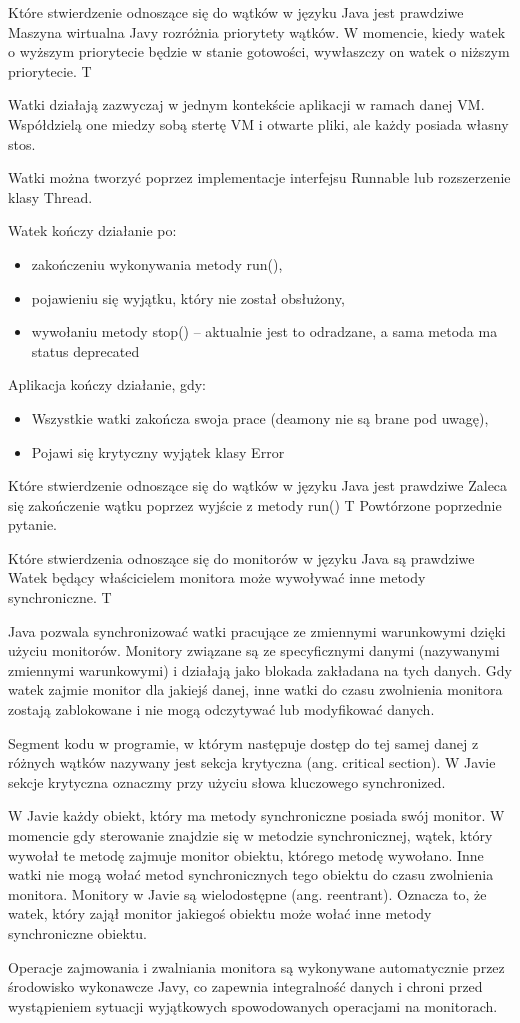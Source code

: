 \answer
{Które stwierdzenie odnoszące się do wątków w języku Java jest prawdziwe}
{Maszyna wirtualna Javy rozróżnia priorytety wątków. W momencie, kiedy watek o wyższym priorytecie będzie w stanie gotowości, wywłaszczy on watek o niższym priorytecie.}
{T}
{Watki działają zazwyczaj w jednym kontekście aplikacji w ramach danej VM. Współdzielą one miedzy sobą stertę VM i otwarte pliki, ale każdy posiada własny stos. 

Watki można tworzyć poprzez implementacje interfejsu Runnable lub rozszerzenie klasy Thread.

Watek kończy działanie po:
\begin{itemize}
 \item zakończeniu wykonywania metody run(),
 \item pojawieniu się wyjątku, który nie został obsłużony,
 \item wywołaniu metody stop() – aktualnie jest to odradzane, a sama metoda ma status deprecated
 \end{itemize}
Aplikacja kończy działanie, gdy:
 \begin{itemize}
 \item Wszystkie watki zakończa swoja prace (deamony nie są brane pod uwagę),
 \item Pojawi się krytyczny wyjątek klasy Error
\end{itemize}
 }
{}

\answer
{Które stwierdzenie odnoszące się do wątków w języku Java jest prawdziwe}
{ Zaleca się zakończenie wątku poprzez wyjście z metody run()}
{T}
{Powtórzone poprzednie pytanie.}
{}

\answer
{Które stwierdzenia odnoszące się do monitorów w języku Java są prawdziwe}
{Watek będący właścicielem monitora może wywoływać inne metody synchroniczne. }
{T}
{Java pozwala synchronizować watki pracujące ze zmiennymi warunkowymi dzięki użyciu monitorów. Monitory związane są ze specyficznymi danymi (nazywanymi zmiennymi warunkowymi) i działają jako blokada zakładana na tych danych. Gdy watek zajmie monitor dla jakiejś danej, inne watki do czasu zwolnienia monitora zostają zablokowane i nie mogą odczytywać lub modyfikować danych.

Segment kodu w programie, w którym następuje dostęp do tej samej danej z różnych wątków nazywany jest sekcja krytyczna (ang. critical section). W Javie sekcje krytyczna oznaczmy przy użyciu słowa kluczowego synchronized.

W Javie każdy obiekt, który ma metody synchroniczne posiada swój monitor. W momencie gdy sterowanie znajdzie się w metodzie synchronicznej, wątek, który wywołał te metodę zajmuje monitor obiektu, którego metodę wywołano. Inne watki nie mogą wołać metod synchronicznych tego obiektu do czasu zwolnienia monitora. Monitory w Javie są wielodostępne (ang. reentrant). Oznacza to, że watek, który zajął monitor jakiegoś obiektu może wołać inne metody synchroniczne obiektu.

Operacje zajmowania i zwalniania monitora są wykonywane automatycznie przez środowisko wykonawcze Javy, co zapewnia integralność danych i chroni przed wystąpieniem sytuacji wyjątkowych spowodowanych operacjami na monitorach.}
{}

